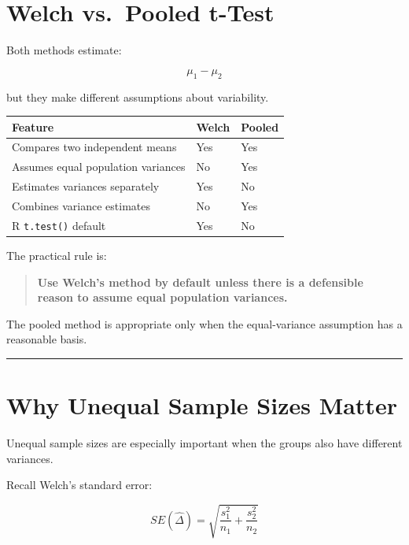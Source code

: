 \documentclass[
  letterpaper,
  DIV=11,
  numbers=noendperiod]{scrreprt}
\newcounter{none} %
\begin{document}

\chapter{Welch vs.~Pooled t-Test}\label{welch-vs.-pooled-t-test}

Both methods estimate:

\[
\mu_1-\mu_2
\]

but they make different assumptions about variability.

{\def\LTcaptype{none} %
\begin{longtable}[]{@{}lll@{}}
\toprule\noalign{}
Feature & Welch & Pooled \\
\midrule\noalign{}
\endhead
\bottomrule\noalign{}
\endlastfoot
Compares two independent means & Yes & Yes \\
Assumes equal population variances & No & Yes \\
Estimates variances separately & Yes & No \\
Combines variance estimates & No & Yes \\
R \texttt{t.test()} default & Yes & No \\
\end{longtable}
}

The practical rule is:

\begin{quote}
\textbf{Use Welch's method by default unless there is a defensible
reason to assume equal population variances.}
\end{quote}

The pooled method is appropriate only when the equal-variance assumption
has a reasonable basis.

\begin{center}\rule{0.5\linewidth}{0.5pt}\end{center}


\chapter{Why Unequal Sample Sizes
Matter}\label{why-unequal-sample-sizes-matter}

Unequal sample sizes are especially important when the groups also have
different variances.

Recall Welch's standard error:

\[
SE(\hat{\Delta})
=
\sqrt{
\frac{s_1^2}{n_1}
+
\frac{s_2^2}{n_2}
}
\]
\end{document}
